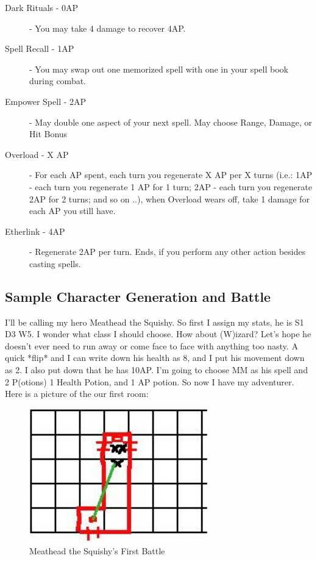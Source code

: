 \documentclass[a6paper,hidelinks]{article}
\begin{document}
\begin{description}

\item[Dark Rituals - 0AP] - You may take 4 damage to recover 4AP.
\item[Spell Recall - 1AP] - You may swap out one memorized spell with one in your spell book during combat.
\item[Empower Spell - 2AP] - May double one aspect of your next spell. May choose Range, Damage, or Hit Bonus
\item[Overload - X AP] - For each AP spent, each turn you regenerate X AP per X turns (i.e.: 1AP - each turn you regenerate 1 AP for 1 turn; 2AP - each turn you regenerate 2AP for 2 turns; and so on ..), when Overload wears off, take 1 damage for each AP you still have.
\item[Etherlink - 4AP] - Regenerate 2AP per turn. Ends, if you perform any other action besides casting spells.

\end{description}

\subsection{Sample Character Generation and Battle}

I’ll be calling my hero Meathead the Squishy.
So first I assign my stats, he is S1 D3 W5. I wonder what class I
should choose. How about (W)izard? Let’s hope he doesn’t
ever need to run away or come face to face with anything too
nasty. A quick *flip* and I can write down his health as 8, and I
put his movement down as 2. I also put down that he has
10AP.
I'm going to choose MM as his spell and 2 P(otions) 1 Health
Potion, and 1 AP potion.
So now I have my adventurer.
Here is a picture of the our first room:

\begin{figure}[h]
\caption{Meathead the Squishy's First Battle}
\label{fig:meatheads_first_battle}
\includegraphics[width=0.8\linewidth]{meatheads_first_battle_vs_kobolds.png}
\end{figure}
\end{document}

